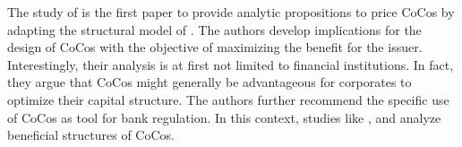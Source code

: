 




The study of \citet{albul2010contingent} is the first paper to provide analytic propositions to price CoCos by adapting the structural model of \citet{leland1994corporate}. The authors develop implications for the design of CoCos with the objective of maximizing the benefit for the issuer. Interestingly, their analysis is at first not limited to financial institutions. In fact, they argue that CoCos might generally be advantageous for corporates to optimize their capital structure. The authors further recommend the specific use of CoCos as tool for bank regulation. In this context, studies like \citet{madan2011conic}, \citet{hilscher2014bank} and \citet{sundaresan2015design} analyze beneficial structures of CoCos.\\

